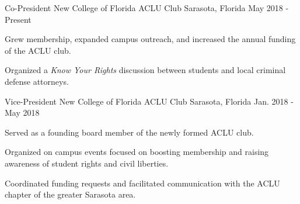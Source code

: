 

\begin{cventries}


  \cventry
    {Co-President} %
    {New College of Florida ACLU Club} %
    {Sarasota, Florida} %
    {May 2018 - Present} %
    {
      \begin{cvitems} %
        \item {Grew membership, expanded campus outreach, and increased the annual funding of the ACLU club.}
        \item {Organized a \emph{Know Your Rights} discussion between students and local criminal defense attorneys.}
      \end{cvitems}
    }

  \cventry
    {Vice-President} %
    {New College of Florida ACLU Club} %
    {Sarasota, Florida} %
    {Jan. 2018 - May 2018} %
    {
      \begin{cvitems} %
        \item {Served as a founding board member of the newly formed ACLU club.}
        \item {Organized on campus events focused on boosting membership and raising awareness of student rights and civil liberties.}
        \item {Coordinated funding requests and facilitated communication with the ACLU chapter of the greater Sarasota area.}
      \end{cvitems}
    }

\end{cventries}
